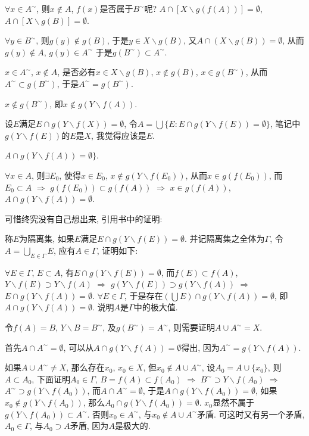 \documentclass[12pt,a4paper,openany]{book}
\begin{document}
$\forall x \in A^{\sim}$, 则$x \notin A$, $f(x)$是否属于$B^{\sim}$呢? $A \cap [X \backslash g(f(A))] = \emptyset$, $A \cap [X \backslash g(B)] = \emptyset$.

$\forall y \in B^{\sim}$, 则$g(y) \notin g(B)$, 于是$y \in X \backslash g(B)$, 又$A \cap (X \backslash g(B)) = \emptyset$, 从而$g(y) \notin A$, $g(y) \in A^{\sim}$ 于是$g(B^{\sim}) \subset A^{\sim}$.

$x \in A^{\sim}$, $x \notin A$, 是否必有$x \in X \backslash g(B)$, $x \notin g(B)$, $x \in g(B^{\sim})$, 从而$A^{\sim} \subset g(B^{\sim})$, 于是$A^{\sim} = g(B^{\sim})$.

$x \notin g(B^{\sim})$, 即$x \notin g(Y \backslash f(A))$.

设$E$满足$E \cap g(Y \backslash f(X)) = \emptyset$, 令$A = \bigcup\{E: E \cap g(Y \backslash f(E)) = \emptyset\}$, 笔记中$g(Y \backslash f(E))$的$E$是$X$, 我觉得应该是$E$.

$A \cap g(Y \backslash f(A)) = \emptyset\}$.

$\forall x \in A$, 则$\exists E_0$, 使得$x \in E_0$, $x \notin g(Y \backslash f(E_0))$, 从而$x \in g(f(E_0))$, 而$E_0 \subset A$ $\Rightarrow$ $g(f(E_0)) \subset g(f(A))$ $\Rightarrow$ $x \in g(f(A))$, $A \cap g(Y \backslash f(A)) = \emptyset$.

可惜终究没有自己想出来, 引用书中的证明:

称$E$为隔离集, 如果$E$满足$E \cap g(Y \backslash f(E)) = \emptyset$. 并记隔离集之全体为$\Gamma$, 令$A = \bigcup\limits_{E \in \Gamma}{E}$, 应有$A \in \Gamma$, 证明如下:

$\forall E \in \Gamma$, $E \subset A$, 有$E \cap g(Y \backslash f(E)) = \emptyset$, 而$f(E) \subset f(A)$, $Y \backslash f(E) \supset Y \backslash f(A)$ $\Rightarrow$ $g(Y \backslash f(E)) \supset g(Y \backslash f(A))$ $\Rightarrow$ $E \cap g(Y \backslash f(A)) = \emptyset$. $\forall E \in \Gamma$, 于是存在$(\bigcup E) \cap g(Y \backslash f(A)) = \emptyset$, 即$A \cap g(Y \backslash f(A)) = \emptyset$. 说明$A$是$\Gamma$中的极大值.

令$f(A) = B$, $Y \backslash B = B^{\sim}$, 及$g(B^{\sim}) = A^{\sim}$, 则需要证明$A \cup A^{\sim} = X$.

首先$A \cap A^{\sim} = \emptyset$, 可以从$A \cap g(Y \backslash f(A)) = \emptyset$得出, 因为$A^{\sim} = g(Y \backslash f(A))$.

如果$A \cup A^{\sim} \neq X$, 那么存在$x_0$, $x_0 \in X$, 但$x_0 \notin A \cup A^{\sim}$, 设$A_0 = A \cup \{x_0\}$, 则$A \subset A_0$, 下面证明$A_0 \in \Gamma$, $B = f(A) \subset f(A_0)$ $\Rightarrow$ $B^{\sim} \supset Y \backslash f(A_0)$ $\Rightarrow$ $A^{\sim} \supset g(Y \backslash f(A_0))$, 而$A \cap A^{\sim} = \emptyset$, 于是$A \cap g(Y \backslash f(A_0)) = \emptyset$, 如果$x_0 \notin g(Y \backslash f(A_0))$, 那么$A_0 \cap g(Y \backslash f(A_0)) = \emptyset$. $x_0$显然不属于$g(Y \backslash f(A_0)) \subset A^{\sim}$. 否则$x_0 \in A^{\sim}$, 与$x_0 \notin A \cup A^{\sim}$矛盾. 可这时又有另一个矛盾, $A_0 \in \Gamma$, 与$A_0 \supset A$矛盾, 因为$A$是极大的.
\end{document}
